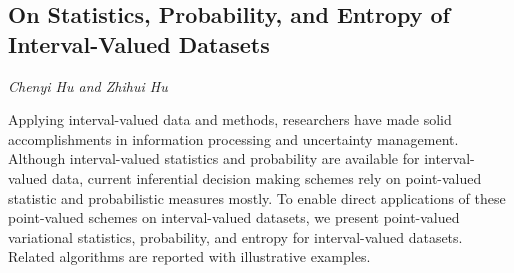 \documentclass[../booklet.tex]{subfiles}
\begin{document}
\subsection[On Statistics, Probability, and Entropy of Interval-Valued Datasets. {\it Chenyi Hu and Zhihui Hu}]{On Statistics, Probability, and Entropy of Interval-Valued Datasets}
 

\begin{center}
  {\it Chenyi Hu and Zhihui Hu}
\end{center}



Applying interval-valued data and methods, researchers have made solid accomplishments in  information processing and  uncertainty management. Although interval-valued statistics and probability are available for interval-valued data, current inferential decision making schemes rely on point-valued statistic and probabilistic measures mostly.  To enable direct applications of these point-valued schemes on interval-valued datasets, we present point-valued variational statistics, probability, and entropy for interval-valued datasets.  Related algorithms are reported with illustrative examples.  

\end{document}
